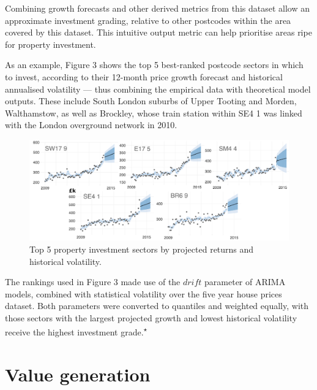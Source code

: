 \documentclass[
10pt, %
a4paper, %
oneside, %
headinclude,footinclude, %
BCOR5mm, %
]{scrartcl}
\begin{document}
Combining growth forecasts and other derived metrics from this
dataset allow an approximate investment grading, relative to other
postcodes within the area covered by this dataset. This intuitive
output metric can help prioritise areas ripe for property investment.

As an example, Figure 3 shows the top 5 best-ranked postcode sectors
in which to invest, according to their 12-month price growth forecast
and historical annualised volatility --- thus combining the empirical
data with theoretical model outputs. These include South London
suburbs of Upper Tooting and Morden, Walthamstow, as well as Brockley,
whose train station within SE4 1 was linked with the London overground network in 2010.\\

\begin{figure}[h]
\begin{center}
\includegraphics[width=.9\textwidth]{Figures/t5.pdf}
\caption{Top 5 property investment sectors by projected returns and historical volatility.}
\end{center}
\end{figure}

The rankings used in Figure 3 made use of the $drift$ parameter of
ARIMA models, combined with statistical volatility over the five year
house prices dataset. Both parameters were converted to quantiles and
weighted equally, with those sectors with the largest projected growth
and lowest historical volatility receive the highest investment grade.\textsuperscript{$\star$}

{\let\thefootnote\relax{}}

\section*{Value generation}
\end{document}
